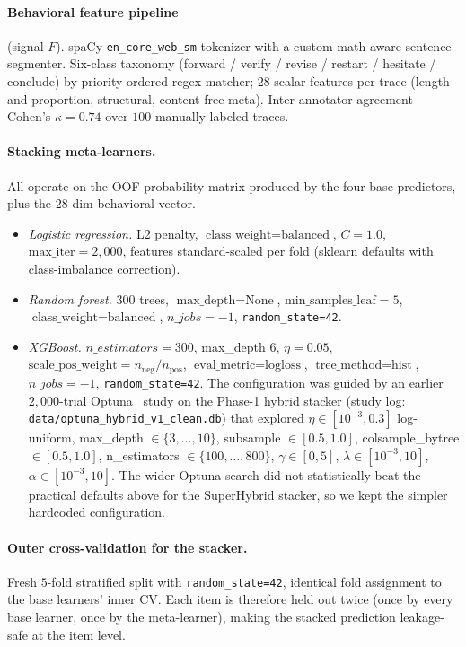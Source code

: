 \documentclass{article}
\begin{document}
\paragraph{Behavioral feature pipeline} (signal $F$). spaCy
\texttt{en\_core\_web\_sm} tokenizer with a custom math-aware sentence
segmenter. Six-class taxonomy
(forward / verify / revise / restart / hesitate / conclude) by
priority-ordered regex matcher; $28$ scalar features per trace (length and
proportion, structural, content-free meta). Inter-annotator agreement
Cohen's $\kappa = 0.74$ over $100$ manually labeled traces.

\paragraph{Stacking meta-learners.} All operate on the OOF probability
matrix produced by the four base predictors, plus the $28$-dim behavioral
vector.

\begin{itemize}\itemsep0.2em\topsep0.2em
\item \emph{Logistic regression.} L2 penalty,
$\text{class\_weight}=\text{balanced}$, $C=1.0$, $\text{max\_iter}=2{,}000$,
features standard-scaled per fold (sklearn defaults with class-imbalance
correction).
\item \emph{Random forest.} $300$ trees, $\text{max\_depth}=\text{None}$,
$\text{min\_samples\_leaf}=5$, $\text{class\_weight}=\text{balanced}$,
$n\_jobs=-1$, \texttt{random\_state=42}.
\item \emph{XGBoost.} $n\_estimators=300$, max\_depth $6$,
$\eta=0.05$, $\text{scale\_pos\_weight}=n_{\text{neg}}/n_{\text{pos}}$,
$\text{eval\_metric}=\text{logloss}$, $\text{tree\_method}=\text{hist}$,
$n\_jobs=-1$, \texttt{random\_state=42}. The configuration was guided by
an earlier $2{,}000$-trial Optuna~\cite{akiba2019optuna} study on the
Phase-1 hybrid stacker (study log: \texttt{data/optuna\_hybrid\_v1\_clean.db})
that explored
$\eta \in [10^{-3}, 0.3]$ log-uniform, max\_depth $\in \{3,\ldots,10\}$,
subsample $\in [0.5, 1.0]$, colsample\_bytree $\in [0.5, 1.0]$,
n\_estimators $\in \{100, \ldots, 800\}$, $\gamma \in [0, 5]$,
$\lambda \in [10^{-3}, 10]$, $\alpha \in [10^{-3}, 10]$. The wider Optuna
search did not statistically beat the practical defaults above for the
SuperHybrid stacker, so we kept the simpler hardcoded configuration.
\end{itemize}

\paragraph{Outer cross-validation for the stacker.} Fresh $5$-fold
stratified split with \texttt{random\_state=42}, identical fold assignment
to the base learners' inner CV. Each item is therefore held out twice
(once by every base learner, once by the meta-learner), making the stacked
prediction leakage-safe at the item level.
\end{document}
